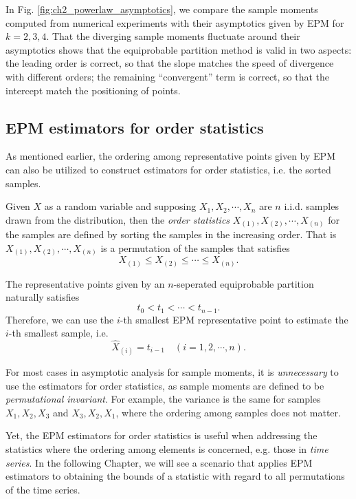 In Fig. \ref{fig:ch2_powerlaw_asymptotics}, we compare the sample moments computed from numerical experiments with their asymptotics given by EPM for $ k=2,3,4 $. That the diverging sample moments fluctuate around their asymptotics shows that the equiprobable partition method is valid in two aspects: the leading order is correct, so that the slope matches the speed of divergence with different orders; the remaining ``convergent'' term is correct, so that the intercept match the positioning of points. 

\subsection{EPM estimators for order statistics}
As mentioned earlier, the ordering among representative points given by EPM can also be utilized to construct estimators for order statistics, i.e. the sorted samples. 

\begin{defn}
Given $ X $ as a random variable and supposing $ X_1, X_2, \cdots, X_n $ are $ n $ i.i.d. samples drawn from the distribution, then the \textit{order statistics}   ${X_{(1)}, X_{(2)}, \cdots, X_{(n)}}$ for the samples are defined by sorting the samples in the increasing order. That is $ X_{(1)}, X_{(2)}, \cdots, X_{(n)} $ is a permutation of the samples that satisfies 
\begin{equation}
X_{(1)} \leq X_{(2)} \leq \cdots \leq X_{(n)}.
\end{equation}
\end{defn}

The representative points given by an $ n $-seperated equiprobable partition naturally satisfies 
\begin{equation}
t_0 < t_1 < \cdots < t_{n-1}.
\end{equation}
Therefore, we can use the $ i $-th smallest EPM representative point to estimate the $ i $-th smallest sample, i.e.
\begin{equation}
\hat{X}_{(i)} = t_{i-1} \quad (i=1, 2, \cdots, n).
\end{equation}

For most cases in asymptotic analysis for sample moments, it is \textit{unnecessary} to use the estimators for order statistics, as sample moments are defined to be \textit{permutational invariant}. For example, the variance is the same for samples $ X_1, X_2, X_3 $ and $ X_3, X_2, X_1 $, where the ordering among samples does not matter.

Yet, the EPM estimators for order statistics is useful when addressing the statistics where the ordering among elements is concerned, e.g. those in \textit{time series}. 
In the following Chapter, we will see a scenario that applies EPM estimators to obtaining the bounds of a statistic with regard to all permutations of the time series.

